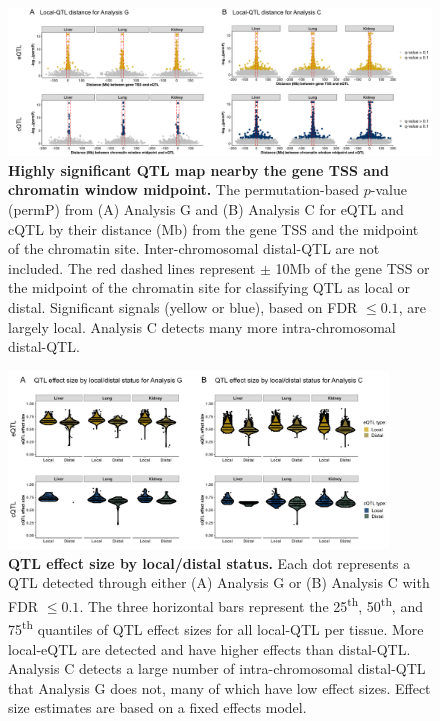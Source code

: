 \documentclass[10pt,letterpaper,twoside]{article}
\begin{document}
\begin{figure}[hp]
\renewcommand{\familydefault}{\sfdefault}\normalfont
\centering
\includegraphics[width=\textwidth]{figs/qtl_distance_all.png}
\caption{\textbf{Highly significant QTL map nearby the gene TSS and chromatin window midpoint.} 
The permutation-based $p$-value (permP) from (A) Analysis G and (B) Analysis C for eQTL and cQTL by their distance (Mb) from the gene TSS and the midpoint of the chromatin site. Inter-chromosomal distal-QTL are not included. The red dashed lines represent $\pm$ 10Mb of the gene TSS or the midpoint of the chromatin site for classifying QTL as local or distal. Significant signals (yellow or blue), based on FDR $\le 0.1$, are largely local. Analysis C detects many more intra-chromosomal distal-QTL.
\label{fig:dist_all}}
\end{figure}

\clearpage

\begin{figure}[hp]
\renewcommand{\familydefault}{\sfdefault}\normalfont
\centering
\includegraphics[width=0.9\textwidth, trim={0in 0.25in 0in 0in}, clip]{figs/qtl_effect_sizes_local_v_distal.png}
\caption{\textbf{QTL effect size by local/distal status.} 
Each dot represents a QTL detected through either (A) Analysis G or (B) Analysis C with FDR $\le 0.1$. The three horizontal bars represent the 25\textsuperscript{th}, 50\textsuperscript{th}, and 75\textsuperscript{th} quantiles of QTL effect sizes for all local-QTL per tissue. More local-eQTL are detected and have higher effects than distal-QTL. Analysis C detects a large number of intra-chromosomal distal-QTL that Analysis G does not, many of which have low effect sizes. Effect size estimates are based on a fixed effects model.
\label{fig:qtl_effect_sizes_local_v_distal}}
\end{figure}
\end{document}
